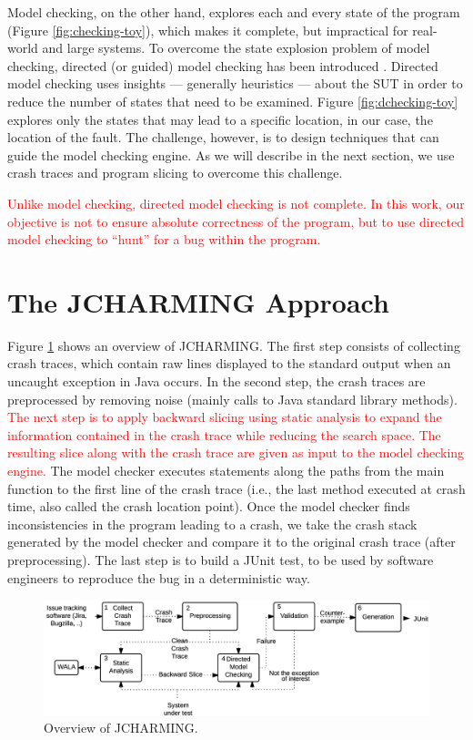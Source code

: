 \documentclass[times, doublespace]{smrauth}
\newcommand{\red}[1]{\textcolor{red}{#1}}
\begin{document}
Model checking, on the other hand, explores each and every state of the program
(Figure \ref{fig:checking-toy}), which makes it complete, but impractical for
real-world and large systems. To overcome the state explosion problem of
model checking, directed (or guided) model checking has been introduced
\cite{Edelkamp2004, Edelkamp2009}. Directed model checking uses insights --- generally
heuristics --- about the SUT in order to reduce the number of states
that need to be examined. Figure \ref{fig:dchecking-toy} explores only
the states that may lead to a specific location, in our case, the
location of the fault. The challenge, however, is to design techniques that
can guide the model checking engine. As we will describe in the next section,
we use crash traces and program slicing to overcome this challenge.

\red{Unlike model checking, directed model checking is not complete. In this work, our objective is not to ensure absolute correctness of the program, but to use directed model checking to ``hunt'' for a bug within the program.}

\section{The JCHARMING Approach\label{sec:jcharming}}

Figure \ref{fig:jcarming-approach} shows an overview of JCHARMING. The first step
consists of collecting crash traces, which contain raw lines
displayed to the standard output when an uncaught exception
in Java occurs. In the second step, the crash traces are
preprocessed by removing noise (mainly calls to Java standard
library methods). \red{The next step is to apply backward slicing
using static analysis to expand the information contained in
the crash trace while reducing the search space. The resulting
slice along with the crash trace are given as input to the model
checking engine.} The model checker executes statements
along the paths from the main function to the first line of the
crash trace (i.e., the last method executed at crash time, also
called the crash location point). Once the model checker finds
inconsistencies in the program leading to a crash, we take the
crash stack generated by the model checker and compare it to
the original crash trace (after preprocessing). The last step is
to build a JUnit test, to be used by software engineers to
reproduce the bug in a deterministic way.

\begin{figure}
  \centering
    \includegraphics[scale=0.8]{media/jcharming-approach.png}
    \caption{Overview of JCHARMING.
    \label{fig:jcarming-approach}}
\end{figure}
\end{document}
